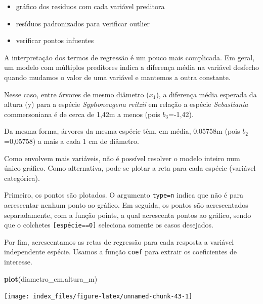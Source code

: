 \documentclass[12pt,brazil,oneside]{book}
\newenvironment{Shaded}{\begin{snugshade}}{\end{snugshade}}
\newcommand{\KeywordTok}[1]{\textcolor[rgb]{0.13,0.29,0.53}{\textbf{#1}}}
\newcommand{\NormalTok}[1]{#1}
\providecommand{\tightlist}{%
  \setlength{\itemsep}{0pt}\setlength{\parskip}{0pt}}
\begin{document}
\begin{itemize}
\tightlist
\item
  gráfico dos resíduos com cada variável preditora
\item
  resíduos padronizados para verificar outlier
\item
  verificar pontos infuentes
\end{itemize}

A interpretação dos termos de regressão é um pouco mais complicada. Em geral, um modelo com múltiplos preditores indica a diferença média na variável desfecho quando mudamos o valor de uma variável e mantemos a outra constante.

Nesse caso, entre árvores de mesmo diâmetro (\(x_1\)), a diferença média esperada da altura (y) para a espécie \emph{Syphoneugena reitzii} em relação a espécie \emph{Sebastiania} commersoniana é de cerca de 1,42m a menos (pois \(b_3\)=-1,42).

Da mesma forma, árvores da mesma espécie têm, em média, 0,05758m (pois \(b_2\)=0,05758) a mais a cada 1 cm de diâmetro.

Como envolvem mais variáveis, não é possível resolver o modelo inteiro num único gráfico. Como alternativa, pode-se plotar a reta para cada espécie (variável categórica).

Primeiro, os pontos são plotados. O argumento \texttt{type=\textquotesingle{}n\textquotesingle{}} indica que não é para acrescentar nenhum ponto ao gráfico.
Em seguida, os pontos são acrescentados separadamente, com a função points, a qual acrescenta pontos ao gráfico, sendo que o colchetes \texttt{{[}espécie==0{]}} seleciona somente os casos desejados.

Por fim, acrescentamos as retas de regressão para cada resposta a variável independente espécie. Usamos a função \texttt{coef} para extrair os coeficientes de interesse.

\begin{Shaded}
\begin{Highlighting}[]
\KeywordTok{plot}\NormalTok{(diametro_cm,altura_m)}
\end{Highlighting}
\end{Shaded}

\begin{center}\texttt{[image: index\_files/figure-latex/unnamed-chunk-43-1]} \end{center}
\end{document}
